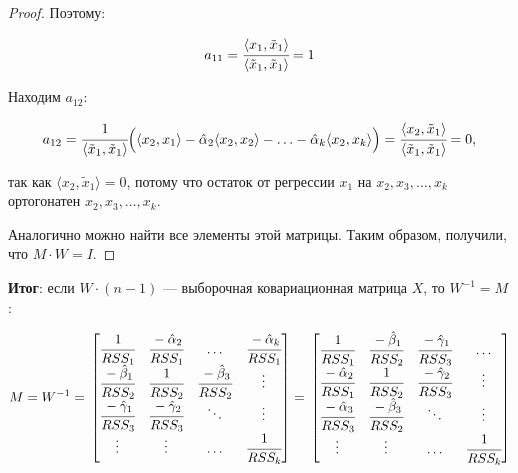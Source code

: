\documentclass[12pt]{article} %
\theoremstyle{definition} %
\def \hb{\hat{\beta}}
\def \ha{\hat{\alpha}}
\def \hg{\hat{\gamma}}
\def \tx{\tilde{x}}
\begin{document}
\begin{proof}
Поэтому:

\[
    a_{11} = \cfrac{\langle x_1,\tx_1 \rangle}{\langle\tx_1,\tx_1 \rangle} = 1 
\]  

Находим $a_{12}$:

\[   
    a_{12} =
    \cfrac{1}{\langle\tx_1,\tx_1 \rangle} \Big ( \langle x_2, x_1 \rangle - \ha_2  \langle x_2, x_2 \rangle  
    - \ldots -  \ha_k  \langle x_2, x_k \rangle   \Big ) = \\
    \cfrac{\langle x_2,\tx_1 \rangle}{\langle\tx_1,\tx_1 \rangle} = 0,
\]

так как $\langle x_2,\tx_1 \rangle = 0$, потому что остаток от регрессии $x_1$ на $x_2,x_3, \dots, x_k$  ортогонатен $x_2,x_3, \dots, x_k$.

Аналогично можно найти все элементы этой матрицы. Таким образом, получили, что $ M \cdot W = I $.

\end{proof}

 \textbf{Итог}: если $W \cdot (n-1)$  — выборочная ковариационная матрица $X$, то $W^{-1} = M$:
 
 \[ 
 M = W^{-1} = \\
    \begin{bmatrix}
        \cfrac{1}{RSS_1} & \cfrac{-\ha_2}{RSS_1} & \ldots &  \cfrac{- \ha_k}{RSS_1} \\
        \cfrac{-\hb_1}{RSS_2} & \cfrac{1}{RSS_2} & \cfrac{-\hb_3}{RSS_2}  & \vdots \\
        \cfrac{-\hg_1}{RSS_3} & \cfrac{-\hg_2}{RSS_3} & \ddots & \vdots \\
        \vdots & \vdots & \ldots & \cfrac{1}{RSS_k} \\
     \end{bmatrix}
     = \\
    \begin{bmatrix}
        \cfrac{1}{RSS_1} & \cfrac{-\hb_1}{RSS_2} & \cfrac{-\hg_1}{RSS_3} & \ldots \\
        \cfrac{-\ha_2}{RSS_1} & \cfrac{1}{RSS_2} & \cfrac{-\hg_2}{RSS_3}  & \vdots \\
        \cfrac{-\ha_3}{RSS_3} & \cfrac{-\hb_3}{RSS_2} & \ddots & \vdots \\
        \vdots & \vdots & \ldots & \cfrac{1}{RSS_k} \\
     \end{bmatrix}
 \]
\end{document}
